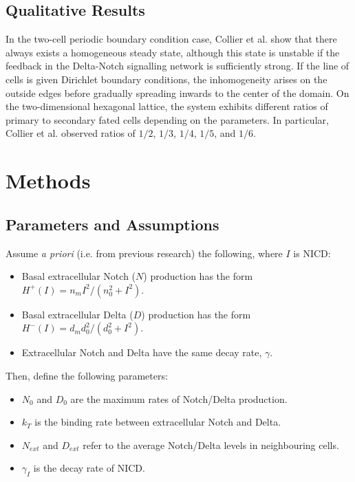 \documentclass{article}
\begin{document}
\begin{flushleft}
\subsection{Qualitative Results}

In the two-cell periodic boundary condition case, Collier et al. show that there always exists a homogeneous steady state, although this state is unstable if the feedback in the Delta-Notch signalling network is sufficiently strong. If the line of cells is given Dirichlet boundary conditions, the inhomogeneity arises on the outside edges before gradually spreading inwards to the center of the domain. On the two-dimensional hexagonal lattice, the system exhibits different ratios of primary to secondary fated cells depending on the parameters. In particular, Collier et al. observed ratios of $1/2$, $1/3$, $1/4$, $1/5$, and $1/6$.

\section{Methods}

\subsection{Parameters and Assumptions}

Assume \emph{a priori} (i.e. from previous research) the following, where $I$ is NICD:

\begin{itemize}
  \item Basal extracellular Notch ($N$) production has the form $H^{+}(I) = n_{m}I^2/(n_{0}^2 + I^2)$. 
  \item Basal extracellular Delta ($D$) production has the form $H^{-}(I) = d_{m}d_{0}^2/(d_{0}^2 + I^2)$.
  \item Extracellular Notch and Delta have the same decay rate, $\gamma$.
\end{itemize}

Then, define the following parameters:

\begin{itemize}
  \item $N_{0}$ and $D_{0}$ are the maximum rates of Notch/Delta production.
  \item $k_{T}$ is the binding rate between extracellular Notch and Delta.
  \item $N_{ext}$ and $D_{ext}$ refer to the average Notch/Delta levels in neighbouring cells.
  \item $\gamma_{I}$ is the decay rate of NICD.
\end{itemize}


\end{flushleft}
\end{document}
